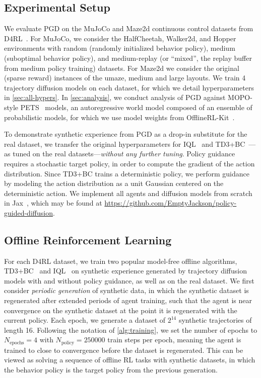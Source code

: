 \documentclass[10pt]{article} %
\theoremstyle{plain}
\theoremstyle{definition}
\theoremstyle{remark}
\begin{document}
\subsection{Experimental Setup}
We evaluate PGD on the MuJoCo and Maze2d continuous control datasets from D4RL~\citep{fu2020d4rl, mujoco}.
For MuJoCo, we consider the HalfCheetah, Walker2d, and Hopper environments with random (randomly initialized behavior policy), medium (suboptimal behavior policy), and medium-replay (or ``mixed'', the replay buffer from medium policy training) datasets. 
For Maze2d we consider the original (sparse reward) instances of the umaze, medium and large layouts.
We train 4 trajectory diffusion models on each dataset, for which we detail hyperparameters in \autoref{sec:all-hypers}.
In \autoref{sec:analysis}, we conduct analysis of PGD against MOPO-style PETS~\citep{chua2018deep} models, an autoregressive world model composed of an ensemble of probabilistic models, for which we use model weights from OfflineRL-Kit~\citep{offinerlkit}.

To demonstrate synthetic experience from PGD as a drop-in substitute for the real dataset, we transfer the original hyperparameters for IQL~\citep{kostrikov2021offline} and TD3+BC~\citep{fujimoto2021minimalist}---as tuned on the real datasets---\textit{without any further tuning}.
Policy guidance requires a stochastic target policy, in order to compute the gradient of the action distribution.
Since TD3+BC trains a deterministic policy, we perform guidance by modeling the action distribution as a unit Gaussian centered on the deterministic action.
We implement all agents and diffusion models from scratch in Jax~\citep{jax2018github}, which may be found at \href{https://github.com/EmptyJackson/policy-guided-diffusion}{https://github.com/EmptyJackson/policy-guided-diffusion}.




\subsection{Offline Reinforcement Learning\label{sec:rl-results}}
For each D4RL dataset, we train two popular model-free offline algorithms, TD3+BC~\citep{fujimoto2021minimalist} and IQL~\citep{kostrikov2021offline} on synthetic experience generated by trajectory diffusion models with and without policy guidance, as well as on the real dataset.
We first consider \textit{periodic generation} of synthetic data, in which the synthetic dataset is regenerated after extended periods of agent training, such that the agent is near convergence on the synthetic dataset at the point it is regenerated with the current policy.
Each epoch, we generate a dataset of $2^{14}$ synthetic trajectories of length 16.
Following the notation of \autoref{alg:training}, we set the number of epochs to $N_\text{epochs} = 4$ with $N_\text{policy} = \num[group-separator={,}]{250000}$ train steps per epoch, meaning the agent is trained to close to convergence before the dataset is regenerated.
This can be viewed as solving a sequence of offline RL tasks with synthetic datasets, in which the behavior policy is the target policy from the previous generation.
\end{document}
